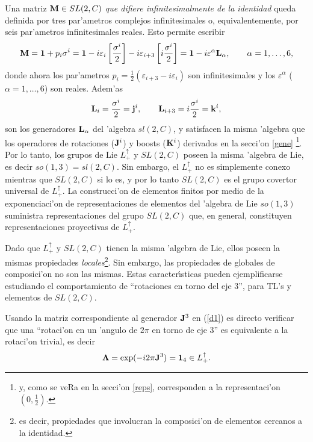 Una matriz ${\bf M}\in SL(2,C)$ {\em que difiere infinitesimalmente de la
identidad} queda definida por tres par'ametros complejos infinitesimales
o, equivalentemente, por seis par'ametros infinitesimales reales. Esto
permite escribir 
\begin{equation}
{\bf M}={\bf 1}+p_{i}{\bf \sigma }^{i}={\bf 1}-i\varepsilon _{i}\left[ \frac{%
{\bf \sigma }^{i}}{2}\right] -i\varepsilon _{i+3}\left[ i\frac{{\bf \sigma }%
^{i}}{2}\right] ={\bf 1}-i\varepsilon ^{\alpha }{\bf L}_{\alpha },\qquad
\alpha =1,\ldots ,6, 
\end{equation}
donde ahora los par'ametros $p_{i}=\frac{1}{2}(\varepsilon
_{i+3}-i\varepsilon _{i})$ son infinitesimales y los $\varepsilon ^{\alpha }$
($\alpha =1,\ldots ,6$) son reales. Adem'as 
\begin{equation}
{\bf L}_{i}=\frac{{\bf \sigma }^{i}}{2}={\bf j}^{i},\qquad {\bf L}_{i+3}=i%
\frac{{\bf \sigma }^{i}}{2}={\bf k}^{i},  \label{gensl2c}
\end{equation}
son los generadores ${\bf L}_{\alpha }$ del 'algebra $sl(2,C)$, y
satisfacen la misma 'algebra que los operadores de rotaciones (${\bf J}%
^{i}$) y boosts (${\bf K}^{i}$) derivados en la secci'on \ref{gene}%
\footnote{%
y, como se veRa en la secci'on \ref{reps}, corresponden a la
representaci'on $(0,\frac{1}{2})$.}. Por lo tanto, los grupos de Lie $%
L_{+}^{\uparrow }$ y $SL(2,C)$ poseen la misma 'algebra de Lie, es decir $%
so(1,3)=sl(2,C)$. Sin embargo, el $L_{+}^{\uparrow }$ no es simplemente
conexo mientras que $SL(2,C)$ si lo es, y por lo tanto $SL(2,C)$ es el grupo
covertor universal de $L_{+}^{\uparrow }$. La construcci'on de elementos
finitos por medio de la exponenciaci'on de representaciones de elementos
del 'algebra de Lie $so(1,3)$ suministra representaciones del grupo $%
SL(2,C)$ que, en general, constituyen representaciones proyectivas de $%
L_{+}^{\uparrow }$.

Dado que $L_{+}^{\uparrow }$ y $SL(2,C)$ tienen la misma 'algebra de Lie,
ellos poseen la mismas propiedades {\em locales}\footnote{%
es decir, propiedades que involucran la composici'on de elementos cercanos a
la identidad.}. Sin embargo, las propiedades de globales de composici'on
no son las mismas. Estas caracter{\'{\i }}sticas pueden ejemplificarse
estudiando el comportamiento de ``rotaciones en torno del eje 3'', para TL's
y elementos de $SL(2,C)$.

Usando la matriz correspondiente al generador ${\bf J}^3$ en (\ref{d1}) es
directo verificar que una ``rotaci'on en un 'angulo de $2\pi $ en
torno de eje $3$'' es equivalente a la rotaci'on trivial, es decir 
\begin{equation}
{\bf \Lambda }=\exp (-i2\pi {\bf J}^3)={\bf 1}_{4}\in L_{+}^{\uparrow }. 
\end{equation}


